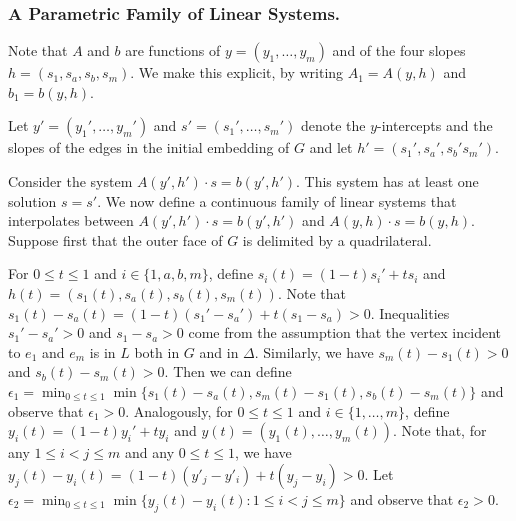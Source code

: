 
\subsubsection{A Parametric Family of Linear Systems.}
%
Note that $A$ and $b$ are functions of $y=(y_1,\ldots,y_m)$ and of the
four slopes $h=(s_1,s_a,s_b,s_m)$. We make this explicit, by writing
$A_1=A(y,h)$ and $b_1=b(y,h)$.

Let $y'=(y_1',\ldots,y_m')$ and $s'=(s_1',\ldots,s_m')$ denote the
$y$-intercepts and the slopes of the edges in the initial embedding of $G$
and let $h'=(s_1',s_a',s_b's_m')$. 

Consider the system $A(y',h')\cdot s = b(y',h')$.  This system has
at least one solution $s=s'$.  We now define
a continuous family of linear systems that interpolates between $A(y',h')\cdot s=b(y',h')$ and $A(y,h)\cdot s=b(y,h)$. Suppose first that the outer face of $G$ is delimited by a quadrilateral.

For $0\le t\le 1$ and $i\in\{1,a,b,m\}$,  define $s_i(t)=(1-t)s_i' + ts_i$ and $h(t)=(s_1(t),s_a(t),s_b(t),s_m(t))$.
Note that $s_1(t)-s_a(t) = (1-t)(s_1'-s_a') + t(s_1-s_a) > 0$. Inequalities $s_1'-s_a'>0$ and $s_1-s_a>0$ come from the assumption that the vertex incident to  $e_1$ and $e_m$ is in $L$ both in $G$ and in $\Delta$. Similarly, we have $s_m(t)-s_1(t)>0$ and $s_b(t)-s_m(t)>0$. Then we can define $\epsilon_1 = \min_{0\le t\le 1}\min\{s_1(t)-s_a(t), s_m(t)-s_1(t), s_b(t)-s_m(t)\}$ and observe that $\epsilon_1>0$. Analogously, for $0\le t\le 1$ and $i\in\{1,\ldots,m\}$, define $y_i(t) = (1-t)y_i' + ty_i$ and  $y(t)=(y_1(t),\ldots,y_m(t))$.
Note that, for any
$1\le i< j\le m$ and any $0\le t\le 1$, we have $y_j(t) - y_i(t) = (1-t)(y'_j-y'_i) + t(y_j-y_i) > 0$. Let $\epsilon_2=\min_{0\le t\le 1}\min\{y_j(t)-y_i(t): 1\le i< j\le m\}$ and observe that $\epsilon_2 >0$.  

  

